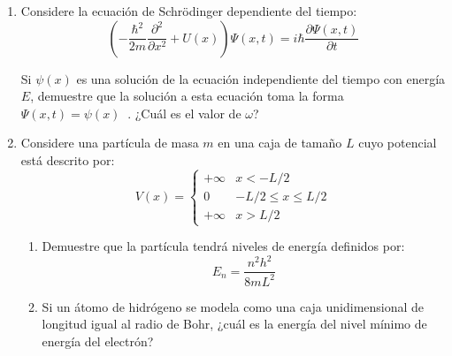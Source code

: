\documentclass[letterpaper,11pt]{article}
\begin{document}
\begin{enumerate}
\item Considere la ecuación de Schrödinger dependiente del tiempo:
\[\left(-\frac{\hbar^2}{2m}\frac{\partial^2 }{\partial x^2} + U(x)\right)\Psi(x,t) = i\hbar \frac{\partial\Psi(x,t)}{\partial t}\]

Si $\psi(x)$ es una solución de la ecuación independiente del tiempo con energía $E$, demuestre que la solución a esta ecuación toma la forma $\Psi(x,t)=\psi(x)\mathop{e^{-i\omega t}}$. ¿Cuál es el valor de $\omega$?

\item Considere una partícula de masa $m$ en una caja de tamaño $L$ cuyo potencial está descrito por:
\[V(x) = 
    \begin{cases}
        +\infty & x<-L/2 \\
        0 & -L/2\leq x\leq L/2\\
        +\infty & x>L/2
    \end{cases}
\]

    \begin{enumerate}
        \item Demuestre que la partícula tendrá niveles de energía definidos por:
        \[E_n = \frac{n^2 h^2}{8mL^2}\]
        
        \item Si un átomo de hidrógeno se modela como una caja unidimensional de longitud igual al radio de Bohr, ¿cuál es la energía del nivel mínimo  de energía del electrón?
    \end{enumerate}
\end{enumerate}
\end{document}
